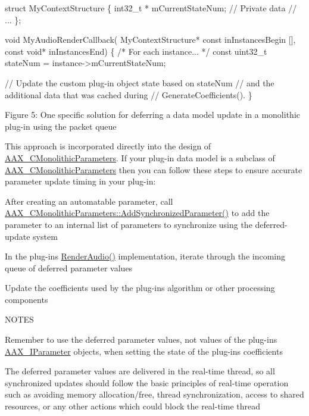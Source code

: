 \begin{DoxyCode}
\textcolor{keyword}{struct }MyContextStructure
\{
  int32\_t * mCurrentStateNum; \textcolor{comment}{// Private data}
  \textcolor{comment}{// ...}
\};

\textcolor{keywordtype}{void}
MyAudioRenderCallback(
  MyContextStructure* \textcolor{keyword}{const} inInstancesBegin [],
  \textcolor{keyword}{const} \textcolor{keywordtype}{void}* inInstancesEnd)
\{
  \textcolor{comment}{/* For each instance... */}
  \textcolor{keyword}{const} uint32\_t stateNum = instance->mCurrentStateNum;
  
  \textcolor{comment}{// Update the custom plug-in object state based on stateNum}
  \textcolor{comment}{// and the additional data that was cached during}
  \textcolor{comment}{// GenerateCoefficients().}
\}   
\end{DoxyCode}


 Figure 5\+: One specific solution for deferring a data model update in a monolithic plug-\/in using the packet queue

This approach is incorporated directly into the design of \hyperlink{a00026}{A\+A\+X\+\_\+\+C\+Monolithic\+Parameters}. If your plug-\/in data model is a subclass of \hyperlink{a00026}{A\+A\+X\+\_\+\+C\+Monolithic\+Parameters} then you can follow these steps to ensure accurate parameter update timing in your plug-\/in\+:


\begin{DoxyEnumerate}
\item After creating an automatable parameter, call \hyperlink{a00026_a1b23573e8aa3f8e64c61813b721559c2}{A\+A\+X\+\_\+\+C\+Monolithic\+Parameters\+::\+Add\+Synchronized\+Parameter()} to add the parameter to an internal list of parameters to synchronize using the deferred-\/update system  
\item In the plug-\/in\textquotesingle{}s \hyperlink{a00026_a04f2f73d70ea28c17747c68fc3a20fc8}{Render\+Audio()} implementation, iterate through the incoming queue of deferred parameter values  
\item Update the coefficients used by the plug-\/in\textquotesingle{}s algorithm or other processing components  
\end{DoxyEnumerate}

N\+O\+T\+E\+S 
\begin{DoxyItemize}
\item Remember to use the deferred parameter values, not values of the plug-\/in\textquotesingle{}s \hyperlink{a00108}{A\+A\+X\+\_\+\+I\+Parameter} objects, when setting the state of the plug-\/in\textquotesingle{}s coefficients  
\item The deferred parameter values are delivered in the real-\/time thread, so all synchronized updates should follow the basic principles of real-\/time operation such as avoiding memory allocation/free, thread synchronization, access to shared resources, or any other actions which could block the real-\/time thread  
\end{DoxyItemize}

